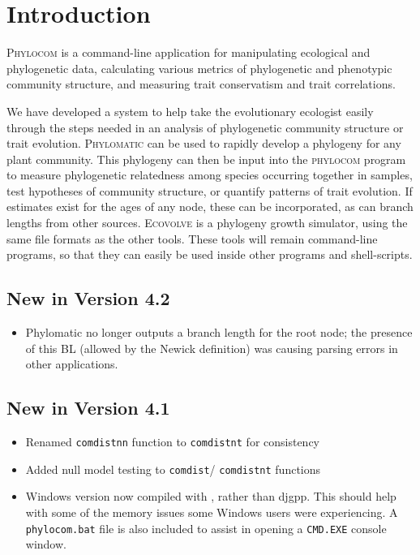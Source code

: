 \documentclass[12pt,letterpaper]{article}
\begin{document}
\tableofcontents %

\newpage

\section{Introduction}

{\scshape Phylocom} is a command-line application for manipulating
ecological and phylogenetic data, calculating various metrics of
phylogenetic and phenotypic community structure, and measuring trait
conservatism and trait correlations.

We have developed a system to help take the evolutionary ecologist
easily through the steps needed in an analysis of phylogenetic
community structure or trait evolution. {\scshape Phylomatic} can be used
to rapidly develop a phylogeny for any plant community.  This
phylogeny can then be input into the {\scshape phylocom} program to measure
phylogenetic relatedness among species occurring together in samples,
test hypotheses of community structure, or quantify patterns of trait
evolution. If estimates exist for the ages of any node, these can be
incorporated, as can branch lengths from other sources. {\scshape Ecovolve}
is a phylogeny growth simulator, using the same file formats as the
other tools. These tools will remain command-line programs, so
that they can easily be used inside other programs and shell-scripts.

\subsection{New in Version 4.2}
\begin{itemize}
 \item Phylomatic no longer outputs a branch length for the root node;
   the presence of this BL (allowed by the Newick definition) was
   causing parsing errors in other applications.
\end{itemize}

\subsection{New in Version 4.1}
\begin{itemize}
 \item Renamed \verb|comdistnn| function to \verb|comdistnt| for
   consistency
 \item Added null model testing to \verb|comdist|/ \verb|comdistnt|
   functions
 \item Windows version now compiled with , rather than {\sc djgpp}.  This
   should help with some of the memory issues some Windows
   users were experiencing.  A \verb|phylocom.bat| file is also
   included to assist in opening a \verb|CMD.EXE| console window. 
\end{itemize}
\end{document}
